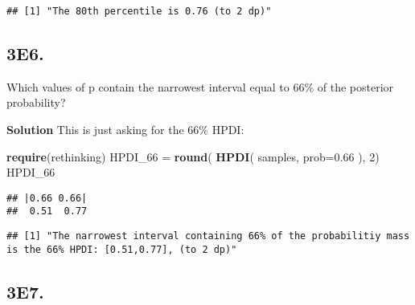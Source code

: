 \documentclass[
]{book}
\newenvironment{Shaded}{\begin{snugshade}}{\end{snugshade}}
\newcommand{\DataTypeTok}[1]{\textcolor[rgb]{0.13,0.29,0.53}{#1}}
\newcommand{\DecValTok}[1]{\textcolor[rgb]{0.00,0.00,0.81}{#1}}
\newcommand{\FloatTok}[1]{\textcolor[rgb]{0.00,0.00,0.81}{#1}}
\newcommand{\KeywordTok}[1]{\textcolor[rgb]{0.13,0.29,0.53}{\textbf{#1}}}
\newcommand{\NormalTok}[1]{#1}
\newcommand{\StringTok}[1]{\textcolor[rgb]{0.31,0.60,0.02}{#1}}
\begin{document}
\begin{verbatim}
## [1] "The 80th percentile is 0.76 (to 2 dp)"
\end{verbatim}

\hypertarget{e6.}{%
\subsection{3E6.}\label{e6.}}

Which values of p contain the narrowest interval equal to 66\% of the posterior probability?

\textbf{Solution}
This is just asking for the 66\% HPDI:

\begin{Shaded}
\begin{Highlighting}[]
\KeywordTok{require}\NormalTok{(rethinking)}
\NormalTok{HPDI_}\DecValTok{66}\NormalTok{ =}\StringTok{ }\KeywordTok{round}\NormalTok{( }\KeywordTok{HPDI}\NormalTok{( samples, }\DataTypeTok{prob=}\FloatTok{0.66}\NormalTok{ ), }\DecValTok{2}\NormalTok{)}
\NormalTok{HPDI_}\DecValTok{66}
\end{Highlighting}
\end{Shaded}

\begin{verbatim}
## |0.66 0.66| 
##  0.51  0.77
\end{verbatim}

\begin{Shaded}
\end{Shaded}

\begin{verbatim}
## [1] "The narrowest interval containing 66% of the probabilitiy mass is the 66% HPDI: [0.51,0.77], (to 2 dp)"
\end{verbatim}

\hypertarget{e7.}{%
\subsection{3E7.}\label{e7.}}
\end{document}
